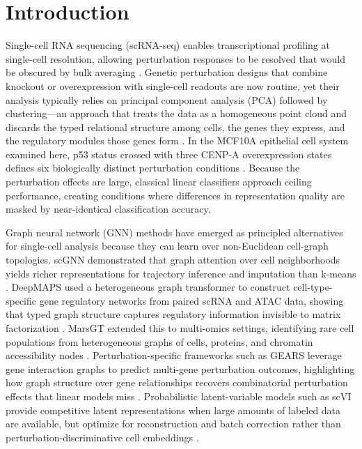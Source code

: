 \section{Introduction}

Single-cell RNA sequencing (scRNA-seq) enables transcriptional profiling at
single-cell resolution, allowing perturbation responses to be resolved that
would be obscured by bulk averaging \citep{wang2021scgnn}.
Genetic perturbation designs that combine knockout or overexpression with
single-cell readouts are now routine, yet their analysis typically relies on
principal component analysis (PCA) followed by clustering---an approach that
treats the data as a homogeneous point cloud and discards the typed relational
structure among cells, the genes they express, and the regulatory modules
those genes form \citep{chervov2022cellcycle}.
In the MCF10A epithelial cell system examined here, p53 status crossed with
three CENP-A overexpression states defines six biologically distinct perturbation
conditions \citep{jeffery2022cenpa}.
Because the perturbation effects are large, classical linear classifiers approach
ceiling performance, creating conditions where differences in representation quality
are masked by near-identical classification accuracy.

Graph neural network (GNN) methods have emerged as principled alternatives for
single-cell analysis because they can learn over non-Euclidean cell-graph
topologies.
scGNN demonstrated that graph attention over cell neighborhoods yields richer
representations for trajectory inference and imputation than k-means
\citep{wang2021scgnn}.
DeepMAPS used a heterogeneous graph transformer to construct cell-type-specific
gene regulatory networks from paired scRNA and ATAC data, showing that typed
graph structure captures regulatory information invisible to matrix factorization
\citep{ma2023deepmaps}.
MarsGT extended this to multi-omics settings, identifying rare cell populations
from heterogeneous graphs of cells, proteins, and chromatin accessibility nodes
\citep{wu2024marsgt}.
Perturbation-specific frameworks such as GEARS leverage gene interaction graphs
to predict multi-gene perturbation outcomes, highlighting how graph structure over
gene relationships recovers combinatorial perturbation effects that linear models
miss \citep{roohani2023gears}.
Probabilistic latent-variable models such as scVI provide competitive latent
representations when large amounts of labeled data are available, but optimize
for reconstruction and batch correction rather than perturbation-discriminative
cell embeddings \citep{lopez2018scvi}.

